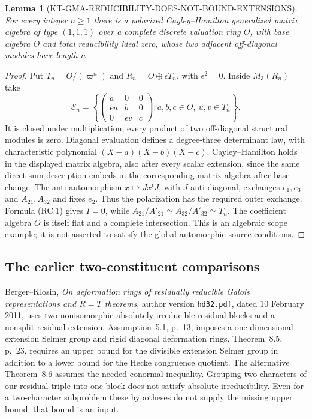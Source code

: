 \documentclass[11pt,a4paper]{article}
\newtheorem{lemma}[theorem]{Lemma}
\theoremstyle{definition}
\begin{document}
\begin{lemma}[KT-GMA-REDUCIBILITY-DOES-NOT-BOUND-EXTENSIONS]
For every integer $n\geq1$ there is a polarized
Cayley--Hamilton generalized matrix algebra of type $(1,1,1)$
over a complete discrete valuation ring $O$, with base
algebra $O$ and total reducibility ideal zero, whose two
adjacent off-diagonal modules have length $n$.
\end{lemma}
\begin{proof}
Put $T_n=O/(\varpi^n)$ and
$R_n=O\oplus\epsilon T_n$, with $\epsilon^2=0$.
Inside $M_3(R_n)$ take
\[
 \mathcal E_n=
 \left\{
 \begin{pmatrix}
 a&0&0\\ \epsilon u&b&0\\0&\epsilon v&c
 \end{pmatrix}:
 a,b,c\in O,\ u,v\in T_n\right\}.                       \tag{RC.3}
\]
It is closed under multiplication; every product of two
off-diagonal structural modules is zero.  Diagonal
evaluation defines a degree-three determinant law, with
characteristic polynomial $(X-a)(X-b)(X-c)$.
Cayley--Hamilton holds in the displayed matrix algebra,
also after every scalar extension, since the same direct
sum description embeds in the corresponding matrix
algebra after base change.  The anti-automorphism
$x\mapsto Jx^tJ$, with $J$ anti-diagonal, exchanges
$e_1,e_3$ and $A_{21},A_{32}$ and fixes $e_2$.
Thus the polarization has the required outer exchange.
Formula (RC.1) gives $I=0$, while
$A_{21}/A'_{21}\simeq A_{32}/A'_{32}\simeq T_n$.
The coefficient algebra $O$ is itself flat and a complete
intersection.  This is an algebraic scope example; it is
not asserted to satisfy the global automorphic source
conditions.
\end{proof}

\subsection{The earlier two-constituent comparisons}

Berger--Klosin, \emph{On deformation rings of residually
reducible Galois representations and $R=T$ theorems},
author version \texttt{hd32.pdf}, dated 10 February 2011,
uses two nonisomorphic absolutely irreducible residual
blocks and a nonsplit residual extension.  Assumption~5.1,
p.~13, imposes a one-dimensional extension Selmer group
and rigid diagonal deformation rings.  Theorem~8.5,
p.~23, requires an upper bound for the divisible extension
Selmer group in addition to a lower bound for the Hecke
congruence quotient.  The alternative Theorem~8.6 assumes
the needed conormal inequality.  Grouping two characters
of our residual triple into one block does not satisfy
absolute irreducibility.  Even for a two-character
subproblem these hypotheses do not supply the missing
upper bound: that bound is an input.
\end{document}
